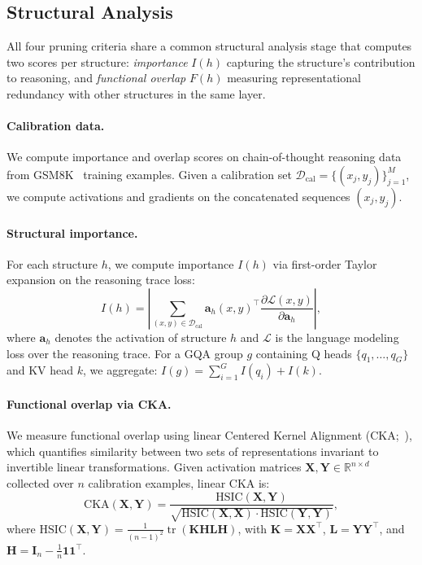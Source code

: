 \subsection{Structural Analysis}
\label{sec:structural_analysis}

All four pruning criteria share a common structural analysis stage that computes two scores per structure: \emph{importance} $I(h)$ capturing the structure's contribution to reasoning, and \emph{functional overlap} $F(h)$ measuring representational redundancy with other structures in the same layer.

\paragraph{Calibration data.}
We compute importance and overlap scores on chain-of-thought reasoning data from GSM8K~\citep{cobbe2021gsm8k} training examples.
Given a calibration set $\mathcal{D}_\text{cal} = \{(x_j, y_j)\}_{j=1}^{M}$, we compute activations and gradients on the concatenated sequences $(x_j, y_j)$.

\paragraph{Structural importance.}
For each structure $h$, we compute importance $I(h)$ via first-order Taylor expansion on the reasoning trace loss:
\begin{equation}
    I(h) = \left| \sum_{(x,y) \in \mathcal{D}_\text{cal}} \mathbf{a}_h(x, y)^\top \frac{\partial \mathcal{L}(x, y)}{\partial \mathbf{a}_h} \right|,
    \label{eq:importance}
\end{equation}
where $\mathbf{a}_h$ denotes the activation of structure $h$ and $\mathcal{L}$ is the language modeling loss over the reasoning trace.
For a GQA group $g$ containing Q heads $\{q_1, \ldots, q_G\}$ and KV head $k$, we aggregate: $I(g) = \sum_{i=1}^{G} I(q_i) + I(k)$.

\paragraph{Functional overlap via CKA.}
We measure functional overlap using linear Centered Kernel Alignment (CKA;~\citealp{kornblith2019cka}), which quantifies similarity between two sets of representations invariant to invertible linear transformations.
Given activation matrices $\mathbf{X}, \mathbf{Y} \in \mathbb{R}^{n \times d}$ collected over $n$ calibration examples, linear CKA is:
\begin{equation}
    \text{CKA}(\mathbf{X}, \mathbf{Y}) = \frac{\text{HSIC}(\mathbf{X}, \mathbf{Y})}{\sqrt{\text{HSIC}(\mathbf{X}, \mathbf{X}) \cdot \text{HSIC}(\mathbf{Y}, \mathbf{Y})}},
    \label{eq:cka}
\end{equation}
where $\text{HSIC}(\mathbf{X}, \mathbf{Y}) = \frac{1}{(n-1)^2} \operatorname{tr}(\mathbf{K} \mathbf{H} \mathbf{L} \mathbf{H})$, with $\mathbf{K} = \mathbf{X}\mathbf{X}^\top$, $\mathbf{L} = \mathbf{Y}\mathbf{Y}^\top$, and $\mathbf{H} = \mathbf{I}_n - \frac{1}{n}\mathbf{1}\mathbf{1}^\top$.

